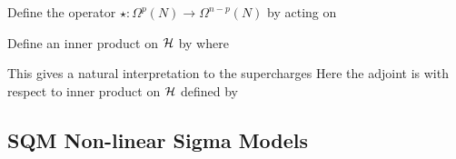 \documentclass{article}
\begin{document}
\begin{definition}
Define the  operator $\star : \Omega^p(N) \to \Omega^{n-p}(N)$ by acting on 
	
	Define an inner product on $\mathcal{H}$ by 
where 
\end{definition}
This gives a natural interpretation to the supercharges 
Here the adjoint is with respect to inner product on $\mathcal{H}$ defined by 
\begin{comment}
	This follows since $\psi^a$ is the adjoint of $\bar{\psi}^a$ so 
	\eq{
	\braket{\alpha|\beta} &= \int_N \alpha_{a_1 \dots a_p} \beta_{b_1 \dots b_p} \sqrt{g} \, d^n x \,  \braket{0 | \psi^{a_1} \dots \psi^{a_p} \bar{\psi}^{b_1} \dots \bar{\psi}^{b_p}} \\
	&= \int_N \bar{\alpha}^{a_1 \dots a_p} \beta_{a_1 \dots a_p} \sqrt{g} \, d^n x 
	}
\end{comment}

\subsection{SQM Non-linear Sigma Models}
\end{document}
